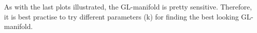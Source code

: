 \begin{tcolorbox}[colback=red!5!white,colframe=red!75!black]
    As with the last plots illustrated, the GL-manifold is pretty sensitive.
    Therefore, it is best practise to try different parameters (k) for finding the best 
    looking GL-manifold.
\end{tcolorbox}



